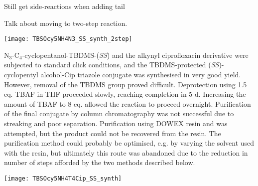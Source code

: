 Still get side-reactions when adding tail


Talk about moving to two-step reaction.

\begin{scheme}[H]
	\begin{center}
				
		\texttt{[image: TBSOcy5NH4N3\_SS\_synth\_2step]}
		\caption{
		a) , , , 0 $^{\circ}$C, 3 h.
		b) , DMF, , r.t., 3 h. 
		99.2 \% over 2 steps. %
		\label{sch:TBSOcy5NH4N3_SS_synth_2step}}
	\end{center}
\end{scheme}

N$_3$-C$_4$-cyclopentanol-TBDMS-(\textit{SS})  and the alkynyl ciprofloxacin derivative  were subjected to standard click conditions, and the TBDMS-protected (\textit{SS})-cyclopentyl alcohol-Cip triazole conjugate  was synthesised in very good yield. However, removal of the TBDMS group proved difficult. Deprotection using 1.5 eq. TBAF in THF proceeded slowly, reaching completion in 5 d. Increasing the amount of TBAF to 8 eq. allowed the reaction to proceed overnight.
Purification of the final conjugate  by column chromatography was not successful due to streaking and poor separation. Purification using DOWEX resin and  was attempted, but the product could not be recovered from the resin.
The purification method could probably be optimised, e.g. by varying the solvent used with the resin, but ultimately this route was abandoned due to the reduction in number of steps afforded by the two methods described below.

\begin{scheme}[H]
	\begin{center}
		\texttt{[image: TBSOcy5NH4T4Cip\_SS\_synth]}
		\caption{
		a) , sodium ascorbate, THPTA, , \textit{t}-BuOH, r.t., 87.4 \%. %
		b) TBAF, THF, r.t., 16 h. %
		\label{sch:TBSOcy5NH4T4Cip_SS_synth}}
	\end{center}
\end{scheme}

